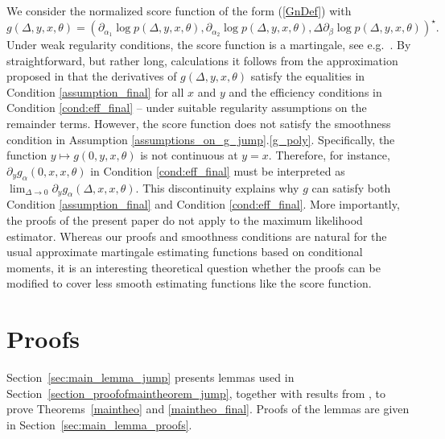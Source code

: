 \documentclass[11pt,a4paper]{article}
\numberwithin{equation}{section}
\numberwithin{theorem}{section}
\begin{document}
We consider the normalized score function of the form (\ref{GnDef}) with
\[
  g(\Delta,y,x,\theta) = \left( \partial_{\alpha_1} \log p(\Delta,y,x,\theta),\partial_{\alpha_2} \log p(\Delta,y,x,\theta), \Delta \partial_{\beta} \log p(\Delta,y,x,\theta)  \right)^\star.
\]    
Under weak regularity conditions, the score function is a martingale, see e.g.\ \cite{oebnms}. By straightforward, but rather long, calculations it follows from the approximation proposed in \cite{yu2007} that the derivatives of $g(\Delta,y,x,\theta)$ satisfy the equalities in Condition \ref{assumption_final} for all $x$ and $y$ and the efficiency conditions in Condition \ref{cond:eff_final} -- under suitable regularity assumptions on the remainder terms. However, the score function does not satisfy the smoothness condition in Assumption \ref{assumptions_on_g_jump}.\ref{g_poly}. Specifically, the function $y \mapsto g(0,y, x,\theta)$ is not continuous at $y=x$. Therefore, for instance, $\partial_y g_\alpha (0,x,x,\theta)$ in Condition \ref{cond:eff_final} must be interpreted as $\lim_{\Delta \rightarrow 0}  \partial_y g_\alpha (\Delta,x,x,\theta)$. This discontinuity explains why $g$ can satisfy both Condition \ref{assumption_final} and Condition \ref{cond:eff_final}. More importantly, the proofs of the present paper do not apply to the maximum likelihood estimator. Whereas our proofs and smoothness conditions are natural for the usual approximate martingale estimating functions based on conditional moments, it is an interesting theoretical question whether the proofs can be modified to cover less smooth estimating functions like the score function.

\section{Proofs}\label{sec:jump_proofs}
%
Section~\ref{sec:main_lemma_jump} presents lemmas used in Section~\ref{section_proofofmaintheorem_jump}, together with results from \cite{jacod2018}, to prove Theorems~\ref{maintheo} and \ref{maintheo_final}. Proofs of the lemmas are given in Section~\ref{sec:main_lemma_proofs}.
\end{document}
